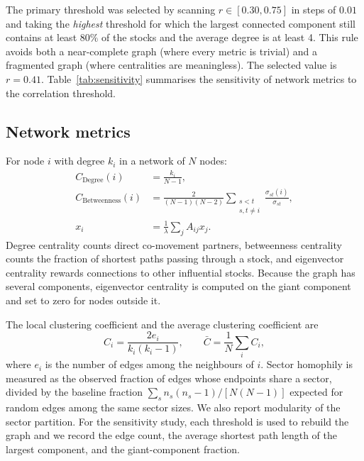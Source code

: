 \documentclass[11pt,a4paper]{article}
\begin{document}


The primary threshold was selected by scanning $r\in[0.30,0.75]$ in steps of
$0.01$ and taking the \emph{highest} threshold for which the largest connected
component still contains at least $80\%$ of the stocks and the average degree
is at least 4. This rule avoids both a near-complete graph (where every metric
is trivial) and a fragmented graph (where centralities are meaningless).
The selected value is $r=0.41$. Table~\ref{tab:sensitivity} summarises the sensitivity of network metrics to the correlation threshold.



\subsection{Network metrics}
For node $i$ with degree $k_i$ in a network of $N$ nodes:
\begin{align}
  C_{\text{Degree}}(i) &= \frac{k_i}{N-1}, \label{eq:deg}\\
  C_{\text{Betweenness}}(i) &=
  \frac{2}{(N-1)(N-2)}
  \sum_{\substack{s<t\\s,t\neq i}}
  \frac{\sigma_{st}(i)}{\sigma_{st}}, \label{eq:bet}\\
  x_i &= \frac{1}{\lambda}\sum_j A_{ij}x_j. \label{eq:eig}
\end{align}
Degree centrality counts direct co-movement partners, betweenness centrality
counts the fraction of shortest paths passing through a stock, and eigenvector
centrality rewards connections to other influential stocks. Because the graph
has several components, eigenvector centrality is computed on the giant
component and set to zero for nodes outside it.

The local clustering coefficient and the average clustering coefficient are
\begin{equation}
  C_i=\frac{2e_i}{k_i(k_i-1)},\qquad
  \bar C=\frac{1}{N}\sum_i C_i,
  \label{eq:clustering}
\end{equation}
where $e_i$ is the number of edges among the neighbours of $i$. Sector
homophily is measured as the observed fraction of edges whose endpoints share
a sector, divided by the baseline fraction
$\sum_s n_s(n_s-1)/[N(N-1)]$ expected for random edges among the same sector
sizes. We also report modularity of the sector partition. For the sensitivity
study, each threshold is used to rebuild the graph and we record the edge
count, the average shortest path length of the largest component, and the
giant-component fraction.
\end{document}
